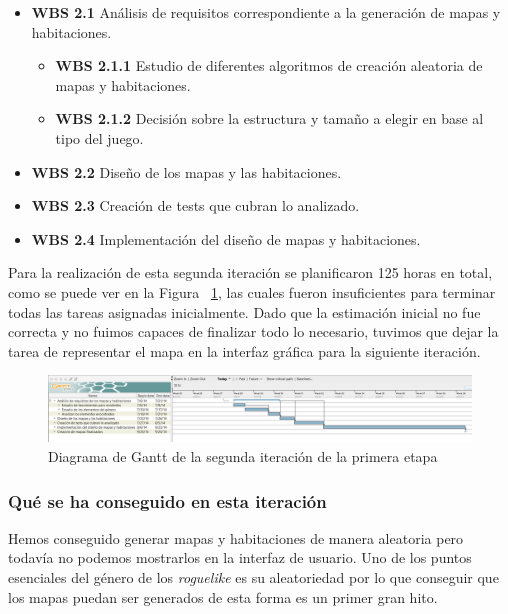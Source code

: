 \begin{itemize}
  \item \textbf{WBS 2.1} Análisis de requisitos correspondiente a la generación de mapas y habitaciones.
    \begin{itemize}
      \item \textbf{WBS 2.1.1} Estudio de diferentes algoritmos de creación aleatoria de mapas y habitaciones.
      \item \textbf{WBS 2.1.2} Decisión sobre la estructura y tamaño a elegir en base al tipo del juego.
    \end{itemize}
  \item \textbf{WBS 2.2} Diseño de los mapas y las habitaciones.
  \item \textbf{WBS 2.3} Creación de tests que cubran lo analizado.
  \item \textbf{WBS 2.4} Implementación del diseño de mapas y habitaciones.
\end{itemize}

\noindent Para la realización de esta segunda iteración se planificaron 125 horas en total, como se puede ver en la Figura ~\ref{fig:sec1it2}, las cuales fueron insuficientes para terminar todas las tareas asignadas inicialmente. Dado que la estimación inicial no fue correcta y no fuimos capaces de finalizar todo lo necesario, tuvimos que dejar la tarea de representar el mapa en la interfaz gráfica para la siguiente iteración.

\begin{figure}
    \includegraphics[width=\textwidth,height=\textheight,keepaspectratio]{./img/sec1it2.png}
  \caption{Diagrama de Gantt de la segunda iteración de la primera etapa}
  \label{fig:sec1it2}
\end{figure}

\subsubsection{Qué se ha conseguido en esta iteración}

Hemos conseguido generar mapas y habitaciones de manera aleatoria pero todavía no podemos mostrarlos en la interfaz de usuario. Uno de los puntos esenciales del género de los \textit{roguelike} es su aleatoriedad por lo que conseguir que los mapas puedan ser generados de esta forma es un primer gran hito.

